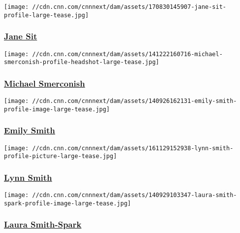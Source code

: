 \href{/profiles/jane-sit-profile}{}

\texttt{[image: //cdn.cnn.com/cnnnext/dam/assets/170830145907-jane-sit-profile-large-tease.jpg]}

\hypertarget{jane-sit}{%
\subsubsection{\texorpdfstring{\href{/profiles/jane-sit-profile}{Jane
Sit}}{Jane Sit}}\label{jane-sit}}

\href{/profiles/michael-smerconish-profile}{}

\texttt{[image: //cdn.cnn.com/cnnnext/dam/assets/141222160716-michael-smerconish-profile-headshot-large-tease.jpg]}

\hypertarget{michael-smerconish}{%
\subsubsection{\texorpdfstring{\href{/profiles/michael-smerconish-profile}{Michael
Smerconish}}{Michael Smerconish}}\label{michael-smerconish}}

\href{/profiles/emily-smith-profile}{}

\texttt{[image: //cdn.cnn.com/cnnnext/dam/assets/140926162131-emily-smith-profile-image-large-tease.jpg]}

\hypertarget{emily-smith}{%
\subsubsection{\texorpdfstring{\href{/profiles/emily-smith-profile}{Emily
Smith}}{Emily Smith}}\label{emily-smith}}

\href{/profiles/lynn-smith}{}

\texttt{[image: //cdn.cnn.com/cnnnext/dam/assets/161129152938-lynn-smith-profile-picture-large-tease.jpg]}

\hypertarget{lynn-smith}{%
\subsubsection{\texorpdfstring{\href{/profiles/lynn-smith}{Lynn
Smith}}{Lynn Smith}}\label{lynn-smith}}

\href{/profiles/laura-smith-spark}{}

\texttt{[image: //cdn.cnn.com/cnnnext/dam/assets/140929103347-laura-smith-spark-profile-image-large-tease.jpg]}

\hypertarget{laura-smith-spark}{%
\subsubsection{\texorpdfstring{\href{/profiles/laura-smith-spark}{Laura
Smith-Spark}}{Laura Smith-Spark}}\label{laura-smith-spark}}

